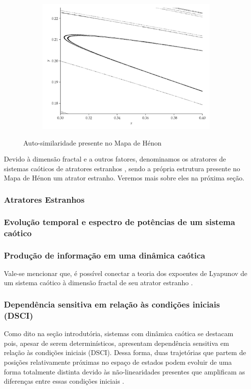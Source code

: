 \documentclass[a4paper, 12pt]{article}
\begin{document}
\begin{figure}[!ht]
\begin{subfigure}[b]{0.45\textwidth}
		\includegraphics[scale=0.4]{mapa-de-henon-zoom-2.png}
	\end{subfigure}
	\caption{Auto-similaridade presente no Mapa de Hénon}
	\label{fig:henon}
\end{figure}

Devido à dimensão fractal e a outros fatores, denominamos os atratores de sistemas caóticos de atratores estranhos \cite{ruelle1971nature}, sendo a própria estrutura presente no Mapa de Hénon um atrator estranho. Veremos mais sobre eles na próxima seção.

\subsubsection{Atratores Estranhos}

\subsubsection{Evolução temporal e espectro de potências de um sistema caótico}

\subsubsection{Produção de informação em uma dinâmica caótica}

Vale-se mencionar que, é possível conectar a teoria dos expoentes de Lyapunov de um sistema caótico à dimensão fractal de seu atrator estranho \cite{attux2001dinamica}.

\subsubsection{Dependência sensitiva em relação às condições iniciais (DSCI)}
Como dito na seção introdutória, sistemas com dinâmica caótica se destacam pois, apesar de serem determinísticos, apresentam dependência sensitiva em relação às condições iniciais (DSCI). Dessa forma, duas trajetórias que partem de posições relativamente próximas no espaço de estados podem evoluir de uma forma totalmente distinta devido às não-linearidades presentes que amplificam as diferenças entre essas condições iniciais \cite{fiedler1994caos}.
\end{document}
